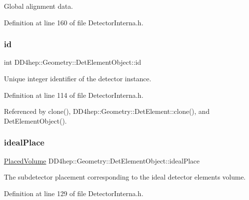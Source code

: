 Global alignment data. 



Definition at line 160 of file Detector\+Interna.\+h.

\hypertarget{class_d_d4hep_1_1_geometry_1_1_det_element_object_a32d2a3f77fa7afde62ad5d08aa14919f}{}\label{class_d_d4hep_1_1_geometry_1_1_det_element_object_a32d2a3f77fa7afde62ad5d08aa14919f} 
\subsubsection{\texorpdfstring{id}{id}}
{\footnotesize\ttfamily int D\+D4hep\+::\+Geometry\+::\+Det\+Element\+Object\+::id}



Unique integer identifier of the detector instance. 



Definition at line 114 of file Detector\+Interna.\+h.



Referenced by clone(), D\+D4hep\+::\+Geometry\+::\+Det\+Element\+::clone(), and Det\+Element\+Object().

\hypertarget{class_d_d4hep_1_1_geometry_1_1_det_element_object_a343542db3151374647357978d11b9b68}{}\label{class_d_d4hep_1_1_geometry_1_1_det_element_object_a343542db3151374647357978d11b9b68} 
\subsubsection{\texorpdfstring{ideal\+Place}{idealPlace}}
{\footnotesize\ttfamily \hyperlink{class_d_d4hep_1_1_geometry_1_1_placed_volume}{Placed\+Volume} D\+D4hep\+::\+Geometry\+::\+Det\+Element\+Object\+::ideal\+Place}



The subdetector placement corresponding to the ideal detector element\textquotesingle{}s volume. 



Definition at line 129 of file Detector\+Interna.\+h.



